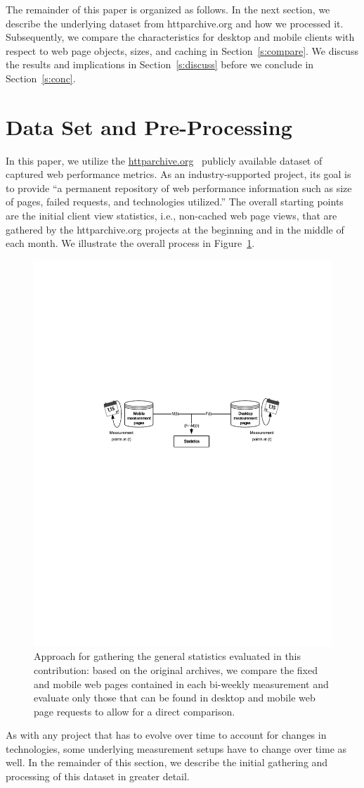 \documentclass[onecolumn,12pt]{IEEEtran}
\begin{document}
The remainder of this paper is organized as follows. 
In the next section, we describe the underlying dataset from httparchive.org and how we processed it.
Subsequently, we compare the characteristics for desktop and mobile clients with respect to web page objects, sizes, and caching in Section~\ref{s:compare}.
We discuss the results and implications in Section~\ref{s:discuss} before we conclude in Section~\ref{s:conc}.

\section{Data Set and Pre-Processing}
\label{s:dataset}
In this paper, we utilize the \url{httparchive.org}~\cite{ht13} publicly available dataset of captured web performance metrics. 
As an industry-supported project, its goal is to provide ``a permanent repository of web performance information such as size of pages, failed requests, and technologies utilized.''
The overall starting points are the initial client view statistics, i.e., non-cached web page views, that are gathered by the httparchive.org projects at the beginning and in the middle of each month.
We illustrate the overall process in Figure~\ref{fig:setup}.
\begin{figure}
	\centering
	\includegraphics[width=.67\linewidth]{./setup}
	\caption{Approach for gathering the general statistics evaluated in this contribution: based on the original archives, we compare the fixed and mobile web pages contained in each bi-weekly measurement and evaluate only those that can be found in desktop and mobile web page requests to allow for a direct comparison.}
	\label{fig:setup}
\end{figure}
As with any project that has to evolve over time to account for changes in technologies, some underlying measurement setups have to change over time as well.
In the remainder of this section, we describe the initial gathering and processing of this dataset in greater detail.
\end{document}
